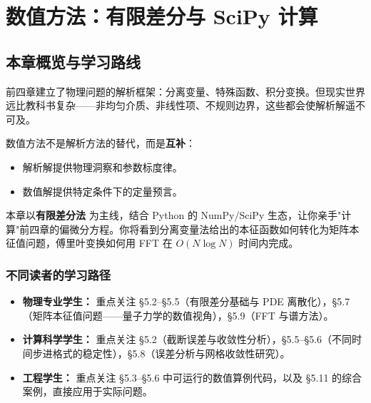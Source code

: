 
\chapter{数值方法：有限差分与 SciPy 计算}

\section{本章概览与学习路线}

前四章建立了物理问题的解析框架：分离变量、特殊函数、积分变换。但现实世界远比教科书复杂——非均匀介质、非线性项、不规则边界，这些都会使解析解遥不可及。

数值方法不是解析方法的替代，而是\textbf{互补}：
\begin{itemize}
\item 解析解提供物理洞察和参数标度律。
\item 数值解提供特定条件下的定量预言。
\end{itemize}

本章以\textbf{有限差分法} 为主线，结合 Python 的 NumPy/SciPy 生态，让你亲手"计算"前四章的偏微分方程。你将看到分离变量法给出的本征函数如何转化为矩阵本征值问题，傅里叶变换如何用 FFT 在 $O(N\log N)$ 时间内完成。

\begin{center}
\end{center}

\subsection*{不同读者的学习路径}

\begin{itemize}
\item \textbf{物理专业学生：} 重点关注 \S5.2--\S5.5（有限差分基础与 PDE 离散化），\S5.7（矩阵本征值问题——量子力学的数值视角），\S5.9（FFT 与谱方法）。
\item \textbf{计算科学学生：} 重点关注 \S5.2（截断误差与收敛性分析），\S5.5--\S5.6（不同时间步进格式的稳定性），\S5.8（误差分析与网格收敛性研究）。
\item \textbf{工程学生：} 重点关注 \S5.3--\S5.6 中可运行的数值算例代码，以及 \S5.11 的综合案例，直接应用于实际问题。
\end{itemize}

